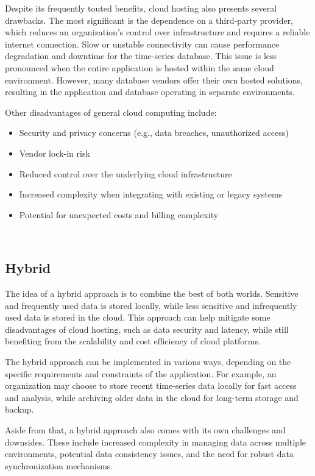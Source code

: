 Despite its frequently touted benefits, cloud hosting also presents several drawbacks. The most significant is the dependence on a third‑party provider, which reduces an organization's control over infrastructure and requires a reliable internet connection. Slow or unstable connectivity can cause performance degradation and downtime for the time‑series database. This issue is less pronounced when the entire application is hosted within the same cloud environment. However, many database vendors offer their own hosted solutions, resulting in the application and database operating in separate environments.

Other disadvantages of general cloud computing include:

\begin{itemize}
  \item Security and privacy concerns (e.g., data breaches, unauthorized access)
  \item Vendor lock-in risk
  \item Reduced control over the underlying cloud infrastructure
  \item Increased complexity when integrating with existing or legacy systems
  \item Potential for unexpected costs and billing complexity
\end{itemize}~\cite{Cloud:05}

\subsection{Hybrid}

The idea of a hybrid approach is to combine the best of both worlds. Sensitive and frequently used data is stored locally, while less sensitive and infrequently used data is stored in the cloud. This approach can help mitigate some disadvantages of cloud hosting, such as data security and latency, while still benefiting from the scalability and cost efficiency of cloud platforms.

The hybrid approach can be implemented in various ways, depending on the specific requirements and constraints of the application. For example, an organization may choose to store recent time-series data locally for fast access and analysis, while archiving older data in the cloud for long-term storage and backup.

Aside from that, a hybrid approach also comes with its own challenges and downsides. These include increased complexity in managing data across multiple environments, potential data consistency issues, and the need for robust data synchronization mechanisms.
